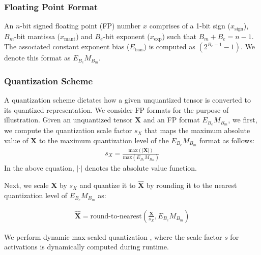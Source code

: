 \subsubsection{Floating Point Format}
An $n$-bit signed floating point (FP) number $x$ comprises of a 1-bit sign ($x_{\mathrm{sign}}$), $B_m$-bit mantissa ($x_{\mathrm{mant}}$) and $B_e$-bit exponent ($x_{\mathrm{exp}}$) such that $B_m+B_e=n-1$. The associated constant exponent bias ($E_{\mathrm{bias}}$) is computed as $(2^{{B_e}-1}-1)$. We denote this format as $E_{B_e}M_{B_m}$.  

\subsubsection{Quantization Scheme}
\label{subsec:quant_method}
A quantization scheme dictates how a given unquantized tensor is converted to its quantized representation. We consider FP formats for the purpose of illustration. Given an unquantized tensor $\bm{X}$ and an FP format $E_{B_e}M_{B_m}$, we first, we compute the quantization scale factor $s_X$ that maps the maximum absolute value of $\bm{X}$ to the maximum quantization level of the $E_{B_e}M_{B_m}$ format as follows:
\begin{align}
\label{eq:sf}
    s_X = \frac{\mathrm{max}(|\bm{X}|)}{\mathrm{max}(E_{B_e}M_{B_m})}
\end{align}
In the above equation, $|\cdot|$ denotes the absolute value function.

Next, we scale $\bm{X}$ by $s_X$ and quantize it to $\hat{\bm{X}}$ by rounding it to the nearest quantization level of $E_{B_e}M_{B_m}$ as:

\begin{align}
\label{eq:tensor_quant}
    \hat{\bm{X}} = \text{round-to-nearest}\left(\frac{\bm{X}}{s_X}, E_{B_e}M_{B_m}\right)
\end{align}

We perform dynamic max-scaled quantization \citep{wu2020integer}, where the scale factor $s$ for activations is dynamically computed during runtime.

